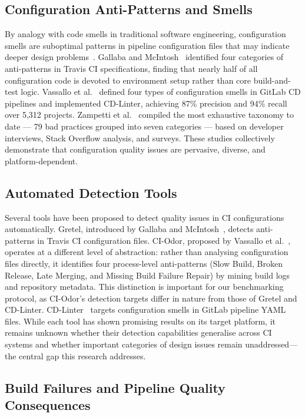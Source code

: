 \documentclass[12pt, a4paper]{article}
\begin{document}
\subsection{Configuration Anti-Patterns and Smells}

By analogy with code smells in traditional software engineering, configuration smells
are suboptimal patterns in pipeline configuration files that may indicate deeper
design problems~\cite{gallaba2020}. Gallaba and McIntosh~\cite{gallaba2020} identified
four categories of anti-patterns in Travis CI specifications, finding that nearly half
of all configuration code is devoted to environment setup rather than core
build-and-test logic. Vassallo et al.~\cite{vassallo2020b} defined four types of
configuration smells in GitLab CD pipelines and implemented CD-Linter, achieving 87\%
precision and 94\% recall over 5,312 projects. Zampetti et al.~\cite{zampetti2020}
compiled the most exhaustive taxonomy to date --- 79 bad practices grouped into seven
categories --- based on developer interviews, Stack Overflow analysis, and surveys.
These studies collectively demonstrate that configuration quality issues are pervasive,
diverse, and platform-dependent.

\subsection{Automated Detection Tools}

Several tools have been proposed to detect quality issues in CI configurations
automatically. Gretel, introduced by Gallaba and McIntosh~\cite{gallaba2020}, detects
anti-patterns in Travis CI configuration files. CI-Odor, proposed by Vassallo et
al.~\cite{vassallo2019}, operates at a different level of abstraction: rather than
analysing configuration files directly, it identifies four process-level anti-patterns
(Slow Build, Broken Release, Late Merging, and Missing Build Failure Repair) by mining
build logs and repository metadata. This distinction is important for our benchmarking
protocol, as CI-Odor's detection targets differ in nature from those of Gretel and
CD-Linter. CD-Linter~\cite{vassallo2020b} targets configuration smells in GitLab
pipeline YAML files. While each tool has shown promising results on its target
platform, it remains unknown whether their detection capabilities generalise across
CI systems and whether important categories of design issues remain
unaddressed---the central gap this research addresses.

\subsection{Build Failures and Pipeline Quality Consequences}
\end{document}

